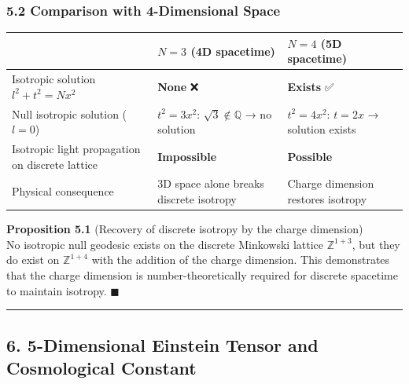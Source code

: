 \documentclass[a4paper,11pt]{article}
\theoremstyle{definition}
\begin{document}
\subsubsection{5.2 Comparison with 4-Dimensional Space}\label{comparison-with-4-dimensional-space}

{\def\LTcaptype{none} %
\begin{longtable}[]{@{}
  >{\raggedright\arraybackslash}p{}
  >{\raggedright\arraybackslash}p{}
  >{\raggedright\arraybackslash}p{}@{}}
\toprule\noalign{}
\begin{minipage}[b]{\linewidth}\raggedright
\end{minipage} & \begin{minipage}[b]{\linewidth}\raggedright
\(N = 3\) (4D spacetime)
\end{minipage} & \begin{minipage}[b]{\linewidth}\raggedright
\(N = 4\) (5D spacetime)
\end{minipage} \\
\midrule\noalign{}
\endhead
\bottomrule\noalign{}
\endlastfoot
Isotropic solution \(l^2 + t^2 = Nx^2\) & \textbf{None} ❌ & \textbf{Exists} ✅ \\
Null isotropic solution (\(l = 0\)) & \(t^2 = 3x^2\): \(\sqrt{3} \notin \mathbb{Q}\) → no solution & \(t^2 = 4x^2\): \(t = 2x\) → solution exists \\
Isotropic light propagation on discrete lattice & \textbf{Impossible} & \textbf{Possible} \\
Physical consequence & 3D space alone breaks discrete isotropy & Charge dimension restores isotropy \\
\end{longtable}
}

\textbf{Proposition 5.1} (Recovery of discrete isotropy by the charge dimension)\\
No isotropic null geodesic exists on the discrete Minkowski lattice \(\mathbb{Z}^{1+3}\), but they do exist on \(\mathbb{Z}^{1+4}\) with the addition of the charge dimension. This demonstrates that the charge dimension is number-theoretically required for discrete spacetime to maintain isotropy. \(\blacksquare\)

\begin{center}\rule{0.5\linewidth}{0.5pt}\end{center}

\subsection{6. 5-Dimensional Einstein Tensor and Cosmological Constant}\label{dimensional-einstein-tensor-and-cosmological-constant}
\end{document}
